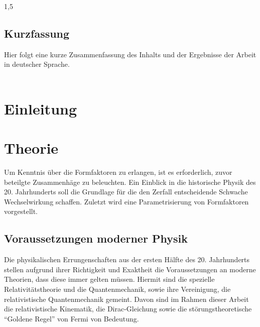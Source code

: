 \documentclass[11pt,a4paper,twoside]{report}
\begin{document}
\begin{spacing}{1,5}
\newpage



\thispagestyle{empty}
\section*{Kurzfassung}
Hier folgt eine kurze Zusammenfassung des Inhalts und der Ergebnisse der Arbeit in deutscher Sprache.\\
\ \\

\newpage


\tableofcontents\newpage
{}
\listoffigures\newpage
{}
\listoftables\newpage

\setcounter{page}{0}

\chapter{Einleitung}



\chapter{Theorie}
Um Kenntnis über die Formfaktoren zu erlangen, ist es erforderlich, zuvor beteilgte Zusammenhäge zu beleuchten. Ein Einblick in die historische Physik
des 20. Jahrhunderts soll die Grundlage für die den Zerfall entscheidende Schwache Wechselwirkung schaffen. Zuletzt wird eine Parametrisierung von Formfaktoren
vorgestellt.

\section{Voraussetzungen moderner Physik}
Die physikalischen Errungenschaften aus der ersten Hälfte des 20. Jahrhunderts stellen aufgrund ihrer Richtigkeit und Exaktheit die Voraussetzungen an moderne 
Theorien, dass diese immer gelten müssen. Hiermit sind die spezielle Relativitätstheorie und die Quantenmechanik, sowie ihre Vereinigung, die relativistische
Quantenmechanik gemeint. Davon sind im Rahmen dieser Arbeit die relativistische Kinematik, die Dirac-Gleichung sowie die störungstheoretische ``Goldene Regel'' von Fermi
von Bedeutung.


\end{spacing}
\end{document}
